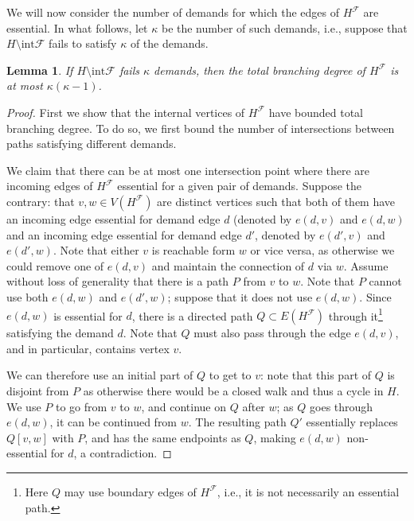 \documentclass[a4paper,11pt]{article}
\newcommand{\inter}{\mathrm{int}}
\newcommand{\calF}{\mathcal{F}}
\theoremstyle{plain}
\newtheorem{lemma}[theorem]{Lemma}
\newtheorem{identification rule}{Identification Rule}
\theoremstyle{definition}
\theoremstyle{remark}
\begin{document}
We will now consider the number of demands for which the edges of $H^\calF$ are essential. In what follows, let $\kappa$ be the number of such demands, i.e., suppose that $H\setminus \inter \calF$ fails to satisfy $\kappa$ of the demands.

\begin{lemma}\label{lem:essentials_intersectioncount}
If $H\setminus \inter \calF$ fails $\kappa$ demands, then the total branching degree of $H^\calF$ is at most $\kappa(\kappa-1)$.
\end{lemma}

\begin{proof}
First we show that the internal vertices of $H^\calF$ have bounded total branching degree. To do so, we first bound the number of intersections between paths satisfying different demands.

We claim that there can be at most one intersection point where there are incoming edges of $H^\calF$ essential for a given pair of demands. Suppose the contrary: that $v,w\in V(H^\calF)$ are distinct vertices such that both of them have an incoming edge essential for demand edge $d$ (denoted by $e(d,v)$ and $e(d,w)$ and an incoming edge essential for demand edge $d'$, denoted by $e(d',v)$ and $e(d',w)$. Note that either $v$ is reachable form $w$ or vice versa, as otherwise we could remove one of $e(d,v)$ and maintain the connection of $d$ via $w$. Assume without loss of generality that there is a path $P$ from $v$ to $w$. Note that $P$ cannot use both $e(d,w)$ and $e(d',w)$; suppose that it does not use $e(d,w)$.  Since $e(d,w)$ is essential for $d$, there is a directed path $Q\subset E(H^\calF)$ through it\footnote{Here $Q$ may use boundary edges of $H^\calF$, i.e., it is not necessarily an essential path.} satisfying the demand $d$. Note that $Q$ must also pass through the edge $e(d,v)$, and in particular, contains vertex $v$.

We can therefore use an initial part of $Q$ to get to $v$: note that this part of $Q$ is disjoint from $P$ as otherwise there would be a closed walk and thus a cycle in $H$. We use $P$ to go from $v$ to $w$, and continue on $Q$ after $w$; as $Q$ goes through $e(d,w)$, it can be continued from $w$. The resulting path $Q'$ essentially replaces $Q[v,w]$ with $P$, and has the same endpoints as $Q$, making $e(d,w)$ non-essential for $d$, a contradiction.


\end{proof}
\end{document}
